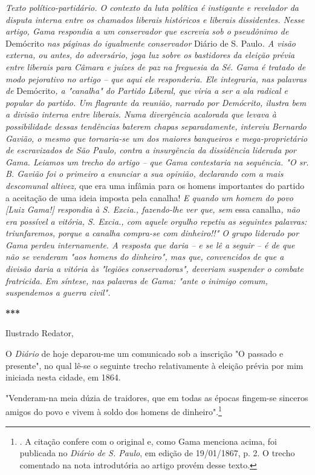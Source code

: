 \emph{Texto político-partidário. O contexto da luta política é
instigante e revelador da disputa interna entre os chamados liberais
históricos e liberais dissidentes. Nesse artigo, Gama respondia a um
conservador que escrevia sob o pseudônimo de} Demócrito \emph{nas
páginas do igualmente conservador} Diário de S. Paulo\emph{. A visão
externa, ou antes, do adversário, joga luz sobre os bastidores da
eleição prévia entre liberais para Câmara e juízes de paz na freguesia
da Sé. Gama é tratado de modo pejorativo no artigo -- que aqui ele
responderia. Ele integraria, nas palavras de} Demócrito\emph{, a
"canalha" do Partido Liberal, que viria a ser a ala radical e popular do
partido. Um flagrante da reunião, narrado por Demócrito, ilustra bem a
divisão interna entre liberais. Numa divergência acalorada que levava à
possibilidade dessas tendências baterem chapas separadamente, interviu
Bernardo Gavião, o mesmo que tornaria-se um dos maiores banqueiros e
mega-proprietário de escravizados de São Paulo, contra a insurgência da
dissidência liderada por Gama. Leiamos um trecho do artigo -- que Gama
contestaria na sequência. "O sr. B. Gavião foi o primeiro a enunciar a
sua opinião, declarando com a mais descomunal altivez,} que era uma
infâmia para os homens importantes do partido a aceitação de uma ideia
imposta pela canalha! \emph{E quando um homem do povo {[}Luiz Gama!{]}
respondia à S. Excia., fazendo-lhe ver que, sem} essa canalha\emph{, não
era possível a vitória, S. Excia., com aquele orgulho repetiu as
seguintes palavras: triunfaremos, porque a canalha compra-se com
dinheiro!!" O grupo liderado por Gama perdeu internamente. A resposta
que daria -- e se lê a seguir -- é de que não se venderam "aos homens do
dinheiro", mas que, convencidos de que a divisão daria a vitória às
"legiões conservadoras", deveriam suspender o combate fratricida. Em
síntese, nas palavras de Gama: "ante o inimigo comum, suspendemos a
guerra civil".}

\textbf{***}

Ilustrado Redator,

O \emph{Diário} de hoje deparou-me um comunicado sob a inscrição "O
passado e presente", no qual lê-se o seguinte trecho relativamente à
eleição prévia por mim iniciada nesta cidade, em 1864.

"Venderam-na meia dúzia de traidores, que em todas as épocas fingem-se
sinceros amigos do povo e vivem à soldo dos homens de
dinheiro".\footnote{. A citação confere com o original e, como Gama
  menciona acima, foi publicada no \emph{Diário de S. Paulo}, em edição
  de 19/01/1867, p. 2. O trecho comentado na nota introdutória ao artigo
  provém desse texto.}

